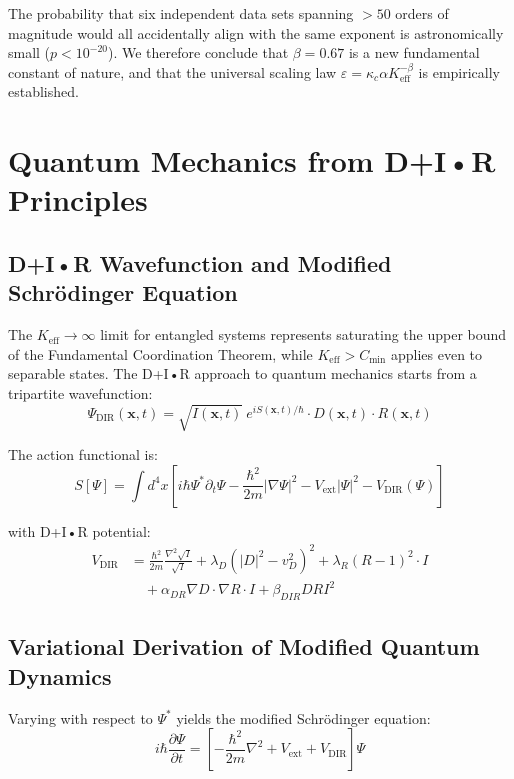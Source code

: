 \documentclass[11pt,a4paper]{article}
\begin{document}
	The probability that six independent data sets spanning \(>50\) orders of magnitude would all accidentally align with the same exponent is astronomically small (\(p < 10^{-20}\)). We therefore conclude that \(\beta = 0.67\) is a new fundamental constant of nature, and that the universal scaling law \(\varepsilon = \kappa_c \alpha K_{\mathrm{eff}}^{-\beta}\) is empirically established.
	
	\section{Quantum Mechanics from D+I•R Principles}
	\subsection{D+I•R Wavefunction and Modified Schrödinger Equation}
	The $K_{\mathrm{eff}} \to \infty$ limit for entangled systems represents saturating the upper bound of the Fundamental Coordination Theorem, while $K_{\mathrm{eff}} > C_{\min}$ applies even to separable states.
	The D+I•R approach to quantum mechanics starts from a tripartite wavefunction:
	\begin{equation}
		\Psi_{\text{DIR}}(\mathbf{x},t) = \sqrt{I(\mathbf{x},t)} \ e^{iS(\mathbf{x},t)/\hbar} \cdot D(\mathbf{x},t) \cdot R(\mathbf{x},t)
	\end{equation}
	
	The action functional is:
	\begin{equation}
		S[\Psi] = \int d^4x \left[ i\hbar \Psi^* \partial_t \Psi - \frac{\hbar^2}{2m} |\nabla \Psi|^2 - V_{\text{ext}} |\Psi|^2 - V_{\text{DIR}}(\Psi) \right]
	\end{equation}
	
	with D+I•R potential:
	\begin{align}
		V_{\text{DIR}} &= \frac{\hbar^2}{2m} \frac{\nabla^2 \sqrt{I}}{\sqrt{I}} 
		+ \lambda_D (|D|^2 - v_D^2)^2 
		+ \lambda_R (R - 1)^2 \cdot I \\
		&\quad + \alpha_{DR} \nabla D \cdot \nabla R \cdot I 
		+ \beta_{DIR} D R I^2
	\end{align}
	
	\subsection{Variational Derivation of Modified Quantum Dynamics}
	
	Varying with respect to $\Psi^*$ yields the modified Schrödinger equation:
	\begin{equation}
		i\hbar \frac{\partial \Psi}{\partial t} = \left[ -\frac{\hbar^2}{2m} \nabla^2 + V_{\text{ext}} + V_{\text{DIR}} \right] \Psi
	\end{equation}
	
\end{document}
